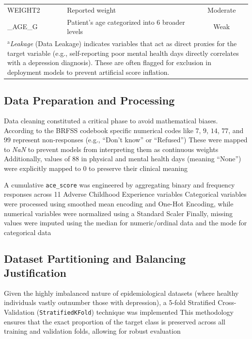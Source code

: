 \documentclass[conference]{IEEEtran}
\begin{document}
\begin{table}[htbp]
\begin{center}
\begin{tabular}{|l|p{4.5cm}|c|}
WEIGHT2 & Reported weight & Moderate \\

\_AGE\_G & Patient's age categorized into 6 broader levels & Weak \\
\hline
\multicolumn{3}{p{8cm}}{$^{\mathrm{a}}$\textit{Leakage} (Data Leakage) indicates variables that act as direct proxies for the target variable (e.g., self-reporting poor mental health days directly correlates with a depression diagnosis). These are often flagged for exclusion in deployment models to prevent artificial score inflation.}
\end{tabular}
\label{tab_rf_importance}
\end{center}
\end{table}

\subsection{Data Preparation and Processing}
Data cleaning constituted a critical phase to avoid mathematical biases. According to the BRFSS codebook \cite{cdc2024brfss} %
specific numerical codes like $7$, $9$, $14$, $77$, and $99$ represent non-responses (e.g., ``Don't know'' or ``Refused'') %
These were mapped to \textit{NaN} to prevent models from interpreting them as continuous weights %
Additionally, values of $88$ in physical and mental health days (meaning ``None'') were explicitly mapped to $0$ to preserve their clinical meaning %

A cumulative \texttt{ace\_score} was engineered by aggregating binary and frequency responses across 11 Adverse Childhood Experience variables %
Categorical variables were processed using smoothed mean encoding and One-Hot Encoding, while numerical variables were normalized using a Standard Scaler %
Finally, missing values were imputed using the median for numeric/ordinal data and the mode for categorical data %

\subsection{Dataset Partitioning and Balancing Justification}
Given the highly imbalanced nature of epidemiological datasets (where healthy individuals vastly outnumber those with depression), a 5-fold Stratified Cross-Validation (\texttt{StratifiedKFold}) technique was implemented %
This methodology ensures that the exact proportion of the target class is preserved across all training and validation folds, allowing for robust evaluation %
\end{document}
